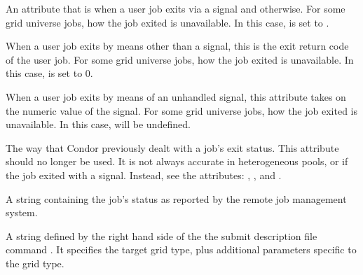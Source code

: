 \begin{description}
\item[\AdAttr{ExitBySignal}:]  An attribute that is 
when a user job exits via a signal and  otherwise.
For some grid universe jobs, how the job exited is
unavailable. In this case,  is set to  .

\item[\AdAttr{ExitCode}:]  When a user job exits by means other than a signal,
this is the exit return code of the user job.
For some grid universe jobs, how the job exited is
unavailable. In this case,  is set to  0.

\item[\AdAttr{ExitSignal}:]  When a user job exits by means of an unhandled 
signal, this attribute takes on the numeric value of the signal.
For some grid universe jobs, how the job exited is
unavailable. In this case,  will be undefined.


\item[\AdAttr{ExitStatus}:]  The way that Condor previously dealt with
a job's exit status.
This attribute should no longer be used.
It is not always accurate in
heterogeneous pools, or if the job exited with a signal.
Instead, see the attributes: ,
, and
.

\item[\AdAttr{GridJobStatus}:] A string containing the job's status as
reported by the remote job management system.

\item[\AdAttr{GridResource}:] A string defined by the right hand side
of the the submit description file command .
It specifies the target grid type, plus additional parameters
specific to the grid type.


\end{description}
